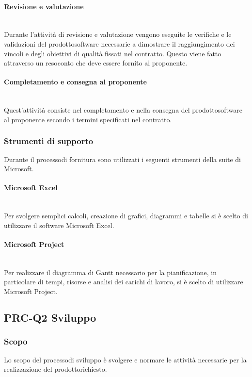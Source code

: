 			\paragraph{Revisione e valutazione}\mbox{}\\ [1mm]
				Durante l'attività di revisione e valutazione vengono eseguite le verifiche e le validazioni del prodotto\glosp software necessarie a dimostrare il raggiungimento dei vincoli e degli obiettivi di qualità fissati nel contratto. Questo viene fatto attraverso un resoconto che deve essere fornito al proponente.
			\paragraph{Completamento e consegna al proponente}\mbox{}\\ [1mm]
				Quest'attività consiste nel completamento e nella consegna del prodotto\glosp software al proponente secondo i termini specificati nel contratto. 
		\subsubsection{Strumenti di supporto}
		Durante il processo\glosp di fornitura sono utilizzati i seguenti strumenti della suite di Microsoft.
			\paragraph{Microsoft Excel}\mbox{}\\ [1mm]
			Per svolgere semplici calcoli, creazione di grafici, diagrammi e tabelle si è scelto di utilizzare il software Microsoft Excel.
			\paragraph{Microsoft Project}\mbox{}\\ [1mm]
			Per realizzare il diagramma di Gantt necessario per la pianificazione, in particolare di tempi, risorse e analisi dei carichi di lavoro, si è scelto di utilizzare Microsoft Project.
	\subsection{PRC-Q2 Sviluppo}
		\subsubsection{Scopo}
		Lo scopo del processo\glosp di sviluppo è svolgere e normare le attività necessarie per la realizzazione del prodotto\glosp richiesto.

